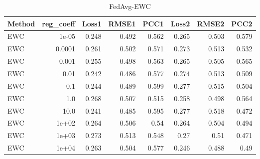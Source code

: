 \begin{table}
\caption{FedAvg-EWC}
\begin{tabular}{lrrrrrrr}
\toprule
Method & reg_coeff & Loss1 & RMSE1 & PCC1 & Loss2 & RMSE2 & PCC2 \\
\midrule
EWC & 1e-05 & 0.248 & 0.492 & 0.562 & 0.265 & 0.503 & 0.579 \\
EWC & 0.0001 & 0.261 & 0.502 & 0.571 & 0.273 & 0.513 & 0.532 \\
EWC & 0.001 & 0.255 & 0.498 & 0.563 & 0.265 & 0.505 & 0.565 \\
EWC & 0.01 & 0.242 & 0.486 & 0.577 & 0.274 & 0.513 & 0.509 \\
EWC & 0.1 & 0.244 & 0.489 & 0.599 & 0.277 & 0.515 & 0.504 \\
EWC & 1.0 & 0.268 & 0.507 & 0.515 & 0.258 & 0.498 & 0.564 \\
EWC & 10.0 & 0.241 & 0.485 & 0.595 & 0.277 & 0.518 & 0.472 \\
EWC & 1e+02 & 0.264 & 0.506 & 0.54 & 0.264 & 0.504 & 0.494 \\
EWC & 1e+03 & 0.273 & 0.513 & 0.548 & 0.27 & 0.51 & 0.471 \\
EWC & 1e+04 & 0.263 & 0.504 & 0.577 & 0.246 & 0.488 & 0.49 \\
\bottomrule
\end{tabular}
\end{table}
